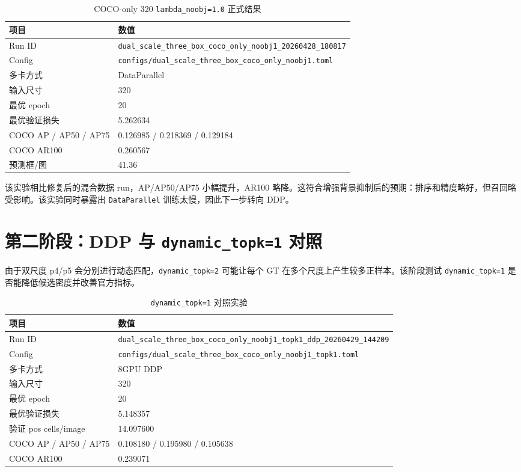 \documentclass[11pt,a4paper]{article}
\begin{document}
\begin{CJK*}{UTF8}{gbsn}
\begin{table}[H]
  \centering
  \caption{COCO-only 320 \texttt{lambda\_noobj=1.0} 正式结果}
  \label{tab:coco-only-320}
  \begin{tabular}{ll}
    \toprule
    项目 & 数值 \\
    \midrule
    Run ID & \texttt{dual\_scale\_three\_box\_coco\_only\_noobj1\_20260428\_180817} \\
    Config & \texttt{configs/dual\_scale\_three\_box\_coco\_only\_noobj1.toml} \\
    多卡方式 & DataParallel \\
    输入尺寸 & 320 \\
    最优 epoch & 20 \\
    最优验证损失 & 5.262634 \\
    COCO AP / AP50 / AP75 & 0.126985 / 0.218369 / 0.129184 \\
    COCO AR100 & 0.260567 \\
    预测框/图 & 41.36 \\
    \bottomrule
  \end{tabular}
\end{table}

该实验相比修复后的混合数据 run，AP/AP50/AP75 小幅提升，AR100 略降。这符合增强背景抑制后的预期：排序和精度略好，但召回略受影响。该实验同时暴露出 \texttt{DataParallel} 训练太慢，因此下一步转向 DDP。

\section{第二阶段：DDP 与 \texttt{dynamic\_topk=1} 对照}

由于双尺度 p4/p5 会分别进行动态匹配，\texttt{dynamic\_topk=2} 可能让每个 GT 在多个尺度上产生较多正样本。该阶段测试 \texttt{dynamic\_topk=1} 是否能降低候选密度并改善官方指标。

\begin{table}[H]
  \centering
  \caption{\texttt{dynamic\_topk=1} 对照实验}
  \label{tab:topk1}
  \begin{tabular}{ll}
    \toprule
    项目 & 数值 \\
    \midrule
    Run ID & \texttt{dual\_scale\_three\_box\_coco\_only\_noobj1\_topk1\_ddp\_20260429\_144209} \\
    Config & \texttt{configs/dual\_scale\_three\_box\_coco\_only\_noobj1\_topk1.toml} \\
    多卡方式 & 8GPU DDP \\
    输入尺寸 & 320 \\
    最优 epoch & 20 \\
    最优验证损失 & 5.148357 \\
    验证 pos cells/image & 14.097600 \\
    COCO AP / AP50 / AP75 & 0.108180 / 0.195980 / 0.105638 \\
    COCO AR100 & 0.239071 \\
    \bottomrule
  \end{tabular}
\end{table}


\end{CJK*}
\end{document}
